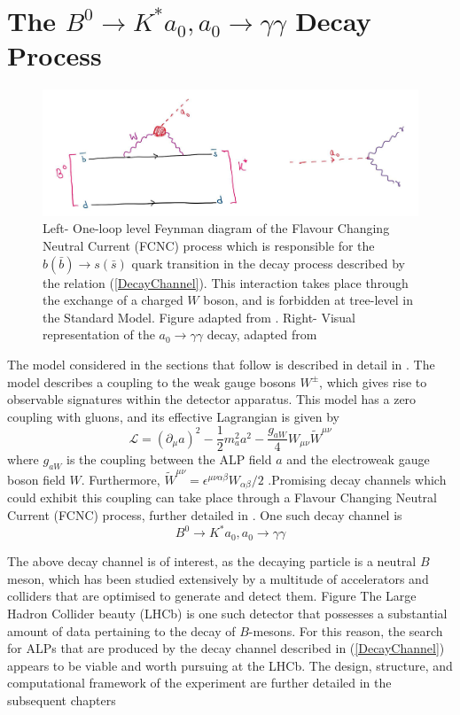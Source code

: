 \section{The $B^{0}\rightarrow K^{*}a_{0}, a_{0}\rightarrow\gamma\gamma$ Decay Process} 
\begin{figure}[H]
    \centering
    \includegraphics[scale=0.45]{FCNCALP.jpg}
    \caption{Left- One-loop level Feynman diagram of the Flavour Changing Neutral Current (FCNC) process which is responsible for the $b(\bar{b})\rightarrow s(\bar{s})$ quark transition in the decay process described by the relation (\ref{DecayChannel}). This interaction takes place through the exchange of a charged $W$ boson, and is forbidden at tree-level in the Standard Model. Figure adapted from \cite{Izaguirre2016ANF}. Right- Visual representation of the $a_{0}\rightarrow\gamma\gamma$ decay, adapted from \cite{Michael:920}}
\end{figure}
The model considered in the sections that follow is described in detail in \cite{Izaguirre2016ANF}. The model describes a
coupling to the weak gauge bosons $W^{\pm}$, which gives rise to observable signatures within the detector apparatus. This model has a
zero coupling with gluons, and its effective Lagrangian is given by
\begin{equation}
    \mathcal{L} = (\partial_{\mu}a)^{2}-\frac{1}{2}m_{a}^{2}a^{2}-\frac{g_{aW}}{4}W_{\mu\nu}\tilde{W}^{\mu\nu}
\end{equation}
where $g_{aW}$ is the coupling between the ALP field $a$ and the electroweak gauge boson field $W$. Furthermore, $\tilde{W}^{\mu\nu} = \epsilon^{\mu\nu\alpha\beta}W_{\alpha\beta}/2$ \cite{Izaguirre2016ANF}.Promising decay channels which could exhibit this coupling can take
place through a Flavour Changing Neutral Current (FCNC) process, further detailed in \cite{Archilli:2017xmu}. One such decay channel is 
\begin{equation}\label{DecayChannel}
    B^{0}\rightarrow K^{*}a_{0}, a_{0}\rightarrow\gamma\gamma
\end{equation}

The above decay channel is of interest, as the decaying particle is a neutral $B$ meson, which has been studied extensively by a multitude of accelerators and colliders that are optimised to generate and detect
them. Figure  The Large Hadron Collider beauty (LHCb) is one such detector that possesses a substantial amount of data pertaining to the decay of $B$-mesons. For this reason, the search for ALPs that are produced by the decay channel
described in (\ref{DecayChannel}) appears to be viable and worth pursuing at the LHCb. The design, structure, and computational framework of the experiment are further detailed in the subsequent chapters




